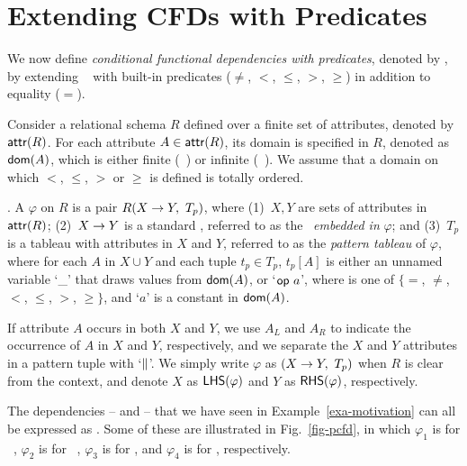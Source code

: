 

\section{Extending CFDs with Predicates}
\label{sec-cfd}



We now define {\em conditional functional dependencies with predicates}, denoted by \pCFDs,
by extending \CFDs~\cite{CFDs} with built-in
predicates ($\ne$, $<$, $\le$, $>$, $\ge$) in addition to equality ($=$).

Consider a relational schema $R$ defined over a finite set of
attributes, denoted by $\protect\mathsf{attr}(R)$. For each attribute $A \in
\protect\mathsf{attr}(R)$, its domain is specified in $R$, denoted as $\protect\mathsf{dom}(A)$,
which is either finite (\eg~)
or infinite (\eg~).
We assume \kwlog that a domain on which $<$, $\le$, $>$ or $\ge$ is defined is totally ordered.


. A \pCFD $\varphi$ on $R$ is a pair
$R(X\rightarrow Y,\ T_p)$, where (1)~$X, Y$ are sets of attributes in
$\protect\mathsf{attr}(R)$; (2)~$X \rightarrow Y$ is a standard \FD, referred to as the
\FD~{\em embedded in} $\varphi$; and (3)~$T_p$ is a tableau with
attributes in $X$ and $Y$, referred to as the {\em pattern tableau}
of $\varphi$, where for each $A$ in $X \cup Y$ and each tuple $t_p
\in T_p$, $t_p[A]$ is either an unnamed
variable `\_' that draws values from $\protect\mathsf{dom}(A)$, or
`$\op a$', where \op is one of $\{=$, $\ne$,
$<$, $\le$, $>$, $\ge\}$,  and `$a$' is a constant in $\protect\mathsf{dom}(A)$.

If attribute $A$
occurs in both $X$ and $Y$, we use $A_L$ and $A_R$ to indicate the
occurrence of $A$ in $X$ and $Y$, respectively, and we separate the $X$
and $Y$ attributes in a pattern tuple with `$\parallel$'.
We simply write $\varphi$ as $(X \rightarrow Y,\ T_p)$ when $R$ is clear from the
context, and denote $X$ as $\relax{{\ensuremath {\mathsf{LHS}}}}(\varphi)$ and $Y$ as
$\relax{{\ensuremath {\mathsf{RHS}}}}(\varphi)$, respectively.



\begin{example}
The dependencies -- and --
that we have seen in Example~\ref{exa-motivation} can all be expressed as \pCFDs.  Some of these \pCFDs
are illustrated in Fig.~\ref{fig-pcfd}, in which $\varphi_1$ is for \FD\ ,
$\varphi_2$ is for \CFD\ , $\varphi_3$ is for ,
and $\varphi_4$ is for , respectively.
\end{example}
\vspace{-1ex}


